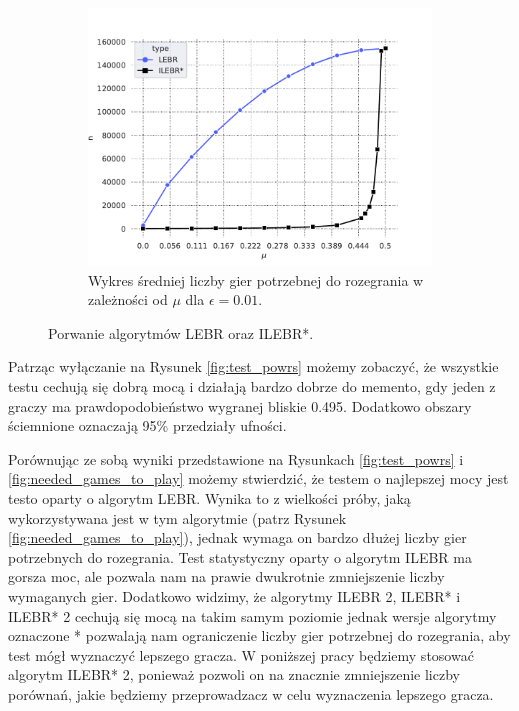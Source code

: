 \documentclass[inzynierska]{pwr_wmat_praca_dyplomowa}
\theoremstyle{plain}
\numberwithin{theorem}{chapter}
\theoremstyle{definition}
\numberwithin{theorem}{chapter}
\begin{document}
\begin{figure}
\begin{subfigure}{.5\textwidth}
		\end{subfigure}%
		\begin{subfigure}[r]{.5\textwidth}
			\centering
			\includegraphics[width=1\linewidth]{imagens/needed_games_to_play_same_n_max.pdf}
			\caption{Wykres średniej liczby gier potrzebnej do rozegrania w zależności od $\mu$ dla $\epsilon=0.01$.}
			\label{fig:game_to_play_same_n_max}
		\end{subfigure}
		\caption{Porwanie algorytmów LEBR oraz ILEBR*.}
		\label{fig:same_n_max}
	\end{figure}

	Patrząc wyłączanie na Rysunek \ref{fig:test_powrs} możemy zobaczyć, że wszystkie testu cechują się dobrą mocą i działają bardzo dobrze do memento, gdy jeden z graczy ma prawdopodobieństwo wygranej bliskie 0.495. Dodatkowo obszary ściemnione oznaczają 95\% przedziały ufności.

	Porównując ze sobą wyniki przedstawione na Rysunkach \ref{fig:test_powrs} i \ref{fig:needed_games_to_play} możemy stwierdzić, że testem o
	najlepszej mocy jest testo oparty o algorytm LEBR. Wynika to z wielkości próby, jaką wykorzystywana jest w tym algorytmie (patrz Rysunek \ref{fig:needed_games_to_play}), jednak wymaga on bardzo dłużej liczby gier potrzebnych do rozegrania.
	Test statystyczny oparty o algorytm ILEBR ma gorsza moc, ale pozwala nam na prawie dwukrotnie zmniejszenie liczby wymaganych gier. Dodatkowo widzimy, że algorytmy  ILEBR 2, ILEBR* i ILEBR* 2 cechują się mocą na takim samym poziomie jednak wersje algorytmy oznaczone * pozwalają nam ograniczenie liczby gier potrzebnej do rozegrania, aby test mógł wyznaczyć lepszego gracza. W poniższej pracy będziemy stosować algorytm ILEBR* 2, ponieważ pozwoli on na znacznie zmniejszenie liczby porównań, jakie będziemy przeprowadzacz w celu wyznaczenia lepszego gracza. 
	
\end{document}
